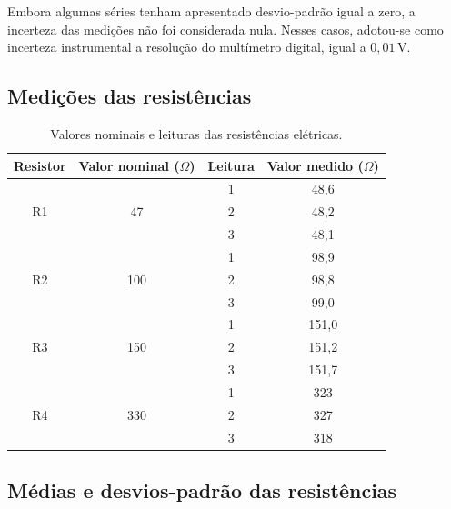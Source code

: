\documentclass[a4paper,12pt]{article}
\begin{document}
Embora algumas séries tenham apresentado desvio-padrão igual a zero,
a incerteza das medições não foi considerada nula. Nesses casos,
adotou-se como incerteza instrumental a resolução do multímetro digital,
igual a \(0{,}01\,\mathrm{V}\).

\subsection{Medições das resistências}

\begin{table}[H]
    \centering
    \caption{Valores nominais e leituras das resistências elétricas.}
    \label{tab:leituras_resistores}
    \medskip

    \begin{tabular}{cccc}
        \toprule
        \textbf{Resistor}
        & \shortstack{\textbf{Valor nominal}\\($\Omega$)}
        & \textbf{Leitura}
        & \shortstack{\textbf{Valor medido}\\($\Omega$)}
        \\
        \midrule

        \multirow{3}{*}{R1}
        & \multirow{3}{*}{47}
        & 1   & 48,6 \\
        & & 2 & 48,2 \\
        & & 3 & 48,1 \\
        \midrule

        \multirow{3}{*}{R2}
        & \multirow{3}{*}{100}
        & 1 & 98,9 \\
        & & 2 & 98,8 \\
        & & 3 & 99,0 \\
        \midrule

        \multirow{3}{*}{R3}
        & \multirow{3}{*}{150}
        & 1 & 151,0 \\
        & & 2 & 151,2 \\
        & & 3 & 151,7 \\
        \midrule

        \multirow{3}{*}{R4}
        & \multirow{3}{*}{330}
        & 1 & 323 \\
        & & 2 & 327 \\
        & & 3 & 318 \\
        \bottomrule
    \end{tabular}
\end{table}


\subsection{Médias e desvios-padrão das resistências}
\end{document}

